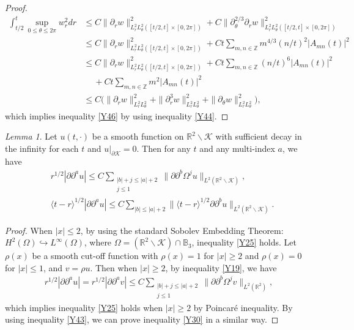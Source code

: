 \documentclass[11pt, reqno]{amsart}
\theoremstyle{definition}
\theoremstyle{remark}
\newtheorem{lem}[thm]{Lemma}
\theoremstyle{definition}
\numberwithin{equation}{section}
\numberwithin{equation}{section}
\def\leq{\leqslant}
\def\geq{\geqslant}
\begin{document}
\begin{proof}
\begin{align*}
\int_{t/2}^t\sup_{0\leq \theta\leq2\pi}w_r^2dr&\leq C\|\partial_rw\|^2_{L_r^2L_{\theta}^2([t/2,t]\times[0,2\pi])}+
C\|\partial_{\theta}^{2/3}\partial_rw\|^2_{L_r^2L_{\theta}^2([t/2,t]\times[0,2\pi])}
\\&\leq C\|\partial_rw\|^2_{L_r^2L_{\theta}^2([t/2,t]\times[0,2\pi])}+Ct\sum_{m,n\in\mathbb
Z}m^{4/3}(n/t)^2|A_{mn}(t)|^2
\\&\leq C\|\partial_rw\|^2_{L_r^2L_{\theta}^2([t/2,t]\times[0,2\pi])}+Ct\sum_{m,n\in\mathbb Z}(n/t)^6|A_{mn}(t)|^2
\\&\quad\ +Ct\sum_{m,n\in\mathbb
Z}m^2|A_{mn}(t)|^2
\\&\leq
C\Big(\|\partial_rw\|^2_{L_r^2L_{\theta}^2}+\|\partial_r^3w\|^2_{L_r^2L_{\theta}^2}+\|\partial_{\theta}w\|^2_{L_r^2L_{\theta}^2}\Big),
\end{align*}
which implies inequality \eqref{Y46} by using inequality
\eqref{Y44}.
\end{proof}
\begin{lem}\label{lem4}
Let $u(t,\cdot)$ be a smooth function on $\mathbb
R^2\backslash\mathcal {K}$ with sufficient decay in the infinity for
each $t$ and $u|_{\partial\mathcal {K}}=0$. Then for any $t$ and any
multi-index $a$, we have
\begin{align}
\label{Y25}&r^{1/2}|\partial\partial^au|\leq
C\sum_{\substack{|b|+j\leq
|a|+2\\j\leq1}}\|\partial\partial^b\Omega^ju\|_{L^2(\mathbb
R^2\backslash\mathcal {K})},
\\&\label{Y30}\langle t-r\rangle^{1/2}|\partial\partial^au|\leq
C\sum_{|b|\leq |a|+2}\|\langle
t-r\rangle^{1/2}\partial\partial^bu\|_{L^2(\mathbb
R^2\backslash\mathcal {K})}.
\end{align}
\end{lem}
\begin{proof}
When $|x|\leq2$, by using the standard Sobolev Embedding Theorem:
$H^2(\Omega)\hookrightarrow L^{\infty}(\Omega)$, where
$\Omega=(\mathbb R^2\backslash\mathcal {K})\cap\mathbb B_3$,
inequality \eqref{Y25} holds. Let $\rho(x)$ be a smooth cut-off
function with $\rho(x)=1$ for $|x|\geq2$ and $\rho(x)=0$ for
$|x|\leq1$, and $v=\rho u$. Then when $|x|\geq2$, by inequality
\eqref{Y19}, we have
\begin{align*}
r^{1/2}|\partial\partial^au|=r^{1/2}|\partial\partial^av|\leq
C\sum_{\substack{|b|+j\leq
|a|+2\\j\leq1}}\|\partial\partial^b\Omega^jv\|_{L^2(\mathbb R^2)},
\end{align*}
which implies inequality \eqref{Y25} holds when $|x|\geq2$ by
Poincar\'{e} inequality. By using inequality \eqref{Y43}, we
can prove inequality \eqref{Y30} in a similar way.
\end{proof}
\end{document}
